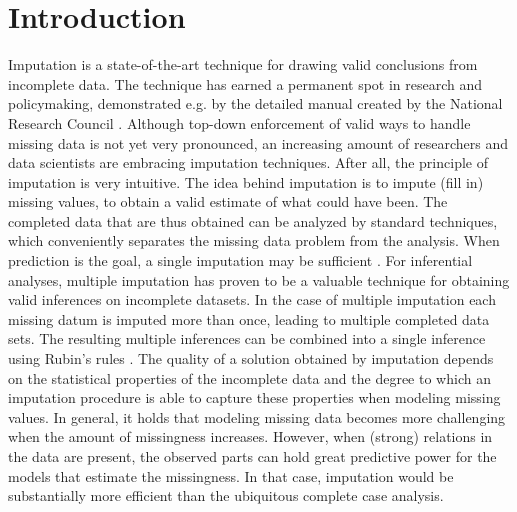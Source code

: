 \documentclass[bimj,fleqn]{w-art}
\begin{document}
\maketitle          %







\section{Introduction}

Imputation is a state-of-the-art technique for drawing valid conclusions from incomplete data. The technique has earned a permanent spot in research and policymaking, demonstrated e.g. by the detailed manual created by the National Research Council \citep*{little2012prevention}. Although top-down enforcement of valid ways to handle missing data is not yet very pronounced, an increasing amount of researchers and data scientists are embracing imputation techniques. After all, the principle of imputation is very intuitive. The idea behind imputation is to impute (fill in) missing values, to obtain a valid estimate of what could have been. The completed data that are thus obtained can be analyzed by standard techniques, which conveniently separates the missing data problem from the analysis. When prediction is the goal, a single imputation may be sufficient \citet{sper20}. For inferential analyses, multiple imputation \citep{rubi76} has proven to be a valuable technique for obtaining valid inferences on incomplete datasets. In the case of multiple imputation each missing datum is imputed more than once, leading to multiple completed data sets. The resulting multiple inferences can be combined into a single inference using Rubin's rules \citep[][p. 76]{rubi87}. The quality of a solution obtained by imputation depends on the statistical properties of the incomplete data and the degree to which an imputation procedure is able to capture these properties when modeling missing values. In general, it holds that modeling missing data becomes more challenging when the amount of missingness increases. However, when (strong) relations in the data are present, the observed parts can hold great predictive power for the models that estimate the missingness. In that case, imputation would be substantially more efficient than the ubiquitous complete case analysis.
\end{document}
